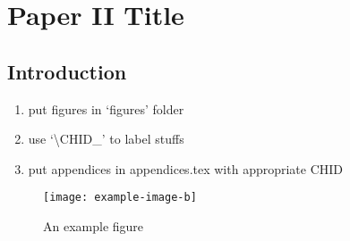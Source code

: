 \chapter{Paper II Title}\label{ch:\CHID}

	

\section{Introduction} \label{\CHID_sec:intro}
	\begin{enumerate}
		\item put figures in `figures' folder
		\item use `\textbackslash CHID\_' to label stuffs
		\item put appendices in appendices.tex with appropriate CHID
	\end{enumerate}
	\begin{figure}[h]
		\centering
		\texttt{[image: example-image-b]}
		\caption{An example figure}\label{\CHID_fig:exmple_image}
	\end{figure}